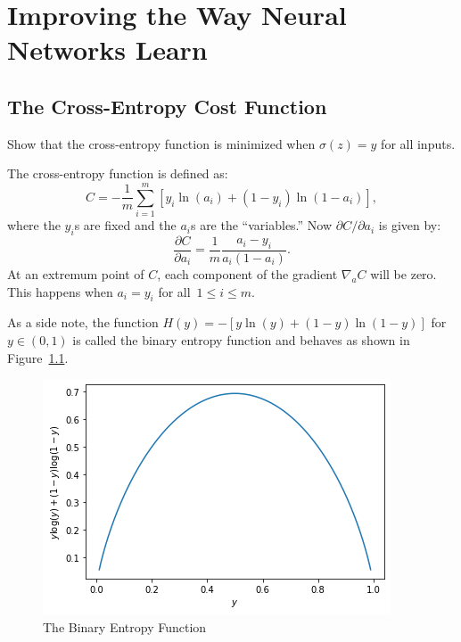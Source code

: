\chapter{Improving the Way Neural Networks Learn}

\section{The Cross-Entropy Cost Function}

\begin{exercise}
Show that the cross-entropy function is minimized when $\sigma(z) = y$ for all inputs.
\end{exercise}
\begin{solution}
The cross-entropy function is defined as:
\[
    C = - \frac{1}{m} \sum_{i = 1}^m [y_i \ln (a_i) + (1 - y_i) \ln (1 - a_i)],
\]
where the $y_i$s are fixed and the $a_i$s are the ``variables.'' Now $\partial C / \partial a_i$
is given by:
\[
    \frac{\partial C}{\partial a_i} = \frac{1}{m} \frac{a_i - y_i}{a_i (1 - a_i)}. 
\]
At an extremum point of $C$, each component of the gradient $\nabla_a C$ will be zero. This 
happens when $a_i = y_i$ for all~$1 \leq i \leq m$. 

As a side note, the function $H(y) = - [y \ln(y) + (1 - y) \ln (1 - y)]$ for $y \in (0, 1)$ 
is called the binary entropy function and behaves as shown in Figure~\ref{fig:binary_entropy}. 
\end{solution}

\begin{figure}[ht]
\begin{center}
\includegraphics[scale=0.60]{entropy.png}
\end{center}
\caption{The Binary Entropy Function}
\label{fig:binary_entropy}
\end{figure}

